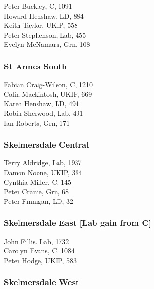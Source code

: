 \documentclass[a4paper,openany,10pt]{book}
\begin{document}
Peter Buckley, C, 1091\\
Howard Henshaw, LD, 884\\
Keith Taylor, UKIP, 558\\
Peter Stephenson, Lab, 455\\
Evelyn McNamara, Grn, 108\\


\subsubsection*{St Annes South}



Fabian Craig-Wilson, C, 1210\\
Colin Mackintosh, UKIP, 669\\
Karen Henshaw, LD, 494\\
Robin Sherwood, Lab, 491\\
Ian Roberts, Grn, 171\\


\subsubsection*{Skelmersdale Central}



Terry Aldridge, Lab, 1937\\
Damon Noone, UKIP, 384\\
Cynthia Miller, C, 145\\
Peter Cranie, Grn, 68\\
Peter Finnigan, LD, 32\\


\subsubsection*{Skelmersdale East \hspace*{\fill}\nolinebreak[1]%
\enspace\hspace*{\fill}
[Lab gain from C]}



John Fillis, Lab, 1732\\
Carolyn Evans, C, 1084\\
Peter Hodge, UKIP, 583\\


\subsubsection*{Skelmersdale West}
\end{document}
